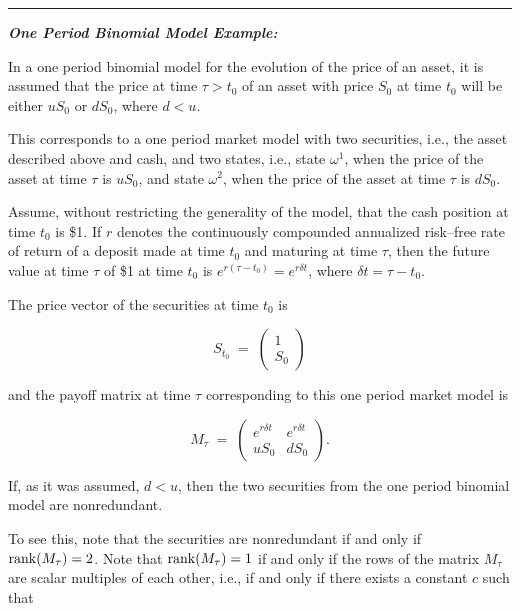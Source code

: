 
\medskip
\noindent\rule{\linewidth}{0.4pt}
\medskip

\noindent\textbf{\textit{One Period Binomial Model Example:}}\par
In a one period binomial model for the evolution of the price of an asset,
it is assumed that the price at time $\tau > t_0$ of an asset with price
$S_0$ at time $t_0$ will be either $uS_0$ or $dS_0$, where $d < u$.

This corresponds to a one period market model with two securities, i.e.,
the asset described above and cash, and two states, i.e., state
$\omega^1$, when the price of the asset at time $\tau$ is $uS_0$, and
state $\omega^2$, when the price of the asset at time $\tau$ is $dS_0$.

Assume, without restricting the generality of the model, that the cash
position at time $t_0$ is \$1. If $r$ denotes the continuously compounded
annualized risk--free rate of return of a deposit made at time $t_0$ and
maturing at time $\tau$, then the future value at time $\tau$ of \$1 at
time $t_0$ is $e^{r(\tau-t_0)} = e^{r\delta t}$, where $\delta t = \tau -
t_0$.

The price vector of the securities at time $t_0$ is

\begin{equation}
S_{t_0} \;=\; \begin{pmatrix} 1 \\ S_0 \end{pmatrix}
\end{equation}

and the payoff matrix at time $\tau$ corresponding to this one period
market model is

\begin{equation}
M_\tau \;=\; \begin{pmatrix} e^{r\delta t} & e^{r\delta t} \\ uS_0 & dS_0
\end{pmatrix}.
\end{equation}

If, as it was assumed, $d < u$, then the two securities from the one
period binomial model are nonredundant.

To see this, note that the securities are nonredundant if and only if
$\operatorname{rank}(M_\tau) = 2$. Note that $\operatorname{rank}(M_\tau) = 1$ if and only if the rows
of the matrix $M_\tau$ are scalar multiples of each other, i.e., if and
only if there exists a constant $c$ such that


